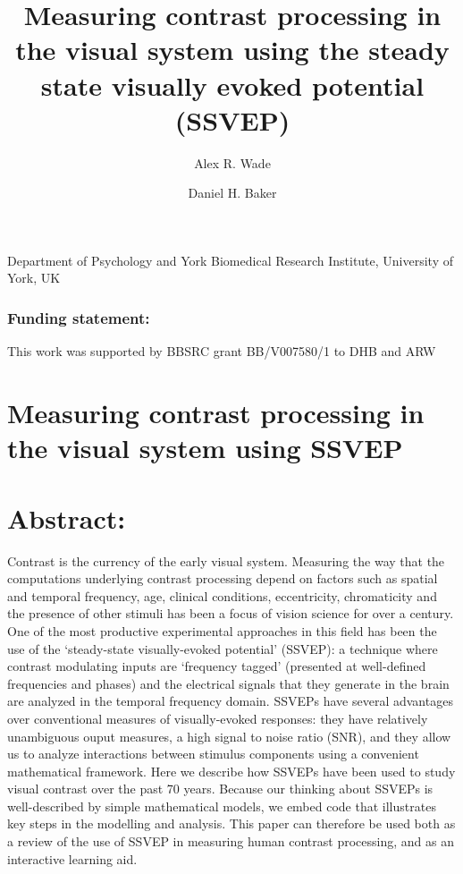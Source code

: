 \documentclass[
  letterpaper,
  DIV=11,
  numbers=noendperiod]{scrartcl}
\title{Measuring contrast processing in the visual system using the
steady state visually evoked potential (SSVEP)}
\author{Alex R. Wade \and Daniel H. Baker}
\date{}
\begin{document}
\maketitle

Department of Psychology and York Biomedical Research Institute,
University of York, UK

\subsubsection{Funding statement:}\label{funding-statement}

This work was supported by BBSRC grant BB/V007580/1 to DHB and ARW

\newpage{}

\section{Measuring contrast processing in the visual system using
SSVEP}\label{measuring-contrast-processing-in-the-visual-system-using-ssvep}

\section{Abstract:}\label{abstract}

Contrast is the currency of the early visual system. Measuring the way
that the computations underlying contrast processing depend on factors
such as spatial and temporal frequency, age, clinical conditions,
eccentricity, chromaticity and the presence of other stimuli has been a
focus of vision science for over a century. One of the most productive
experimental approaches in this field has been the use of the
`steady-state visually-evoked potential' (SSVEP): a technique where
contrast modulating inputs are `frequency tagged' (presented at
well-defined frequencies and phases) and the electrical signals that
they generate in the brain are analyzed in the temporal frequency
domain. SSVEPs have several advantages over conventional measures of
visually-evoked responses: they have relatively unambiguous ouput
measures, a high signal to noise ratio (SNR), and they allow us to
analyze interactions between stimulus components using a convenient
mathematical framework. Here we describe how SSVEPs have been used to
study visual contrast over the past 70 years. Because our thinking about
SSVEPs is well-described by simple mathematical models, we embed code
that illustrates key steps in the modelling and analysis. This paper can
therefore be used both as a review of the use of SSVEP in measuring
human contrast processing, and as an interactive learning aid.
\end{document}
